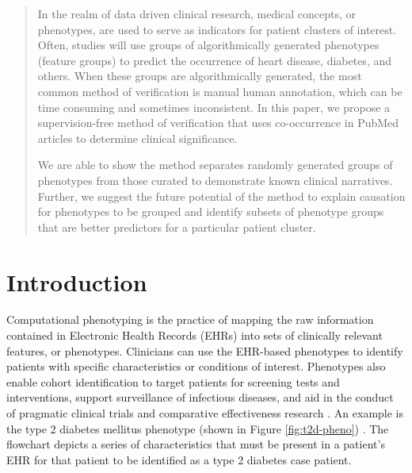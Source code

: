 \documentclass{sig-alternate-05-2015}
\begin{document}
\maketitle
\begin{abstract}
In the realm of data driven clinical research, medical concepts, or phenotypes, are used to serve as indicators for patient clusters of interest. Often, studies will use groups of algorithmically generated phenotypes (feature groups) to predict the occurrence of heart disease, diabetes, and others. 
When these groups are algorithmically generated, the most common method of verification is manual human annotation, which can be time consuming and sometimes inconsistent.
In this paper, we propose a supervision-free method of verification that uses co-occurrence in PubMed articles to determine clinical significance.

We are able to show the method separates randomly generated groups of phenotypes from those curated to demonstrate known clinical narratives. Further, we suggest the future potential of the method to explain causation for phenotypes to be grouped and identify subsets of phenotype groups that are better predictors for a particular patient cluster.
\end{abstract}


%
%
\begin{CCSXML}
\end{CCSXML}



%
%

%
%
\printccsdesc



\section{Introduction}

Computational phenotyping is the practice of mapping the raw information contained in Electronic Health Records (EHRs) into sets of clinically relevant features, or phenotypes.
Clinicians can use the EHR-based phenotypes to identify patients with specific characteristics or conditions of interest.
Phenotypes also enable cohort identification to target patients for screening tests and interventions, support surveillance of infectious diseases, and aid in the conduct of pragmatic clinical trials and comparative effectiveness research \cite{Collaboratory:MR-x2zyZ}.
An example is the type 2 diabetes mellitus phenotype (shown in Figure \ref{fig:t2d-pheno}) \cite{kho_use_2012}.
The flowchart depicts a series of characteristics that must be present in a patient's EHR for that patient to be identified as a type 2 diabetes case patient.
\end{document}
